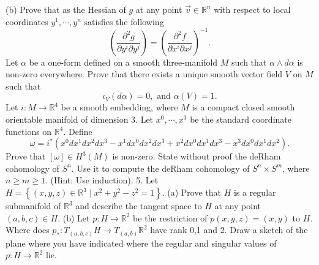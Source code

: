 \documentclass[14pt]{extarticle}
\begin{document}
(b) Prove that as the Hessian of $g$ at any point $\vec{v} \in \mathbb{R}^{n}$ with respect to local coordinates $y^{1}, \cdots, y^{n}$ satisfies the following
$$
\left(\frac{\partial^{2} g}{\partial y^{i} \partial y^{j}}\right)=\left(\frac{\partial^{2} f}{\partial x^{i} \partial x^{j}}\right)^{-1} .
$$
\newpage
Let $\alpha$ be a one-form defined on a smooth three-manifold $M$ such that $\alpha \wedge d \alpha$ is non-zero everywhere.
Prove that there exists a unique smooth vector field $V$ on $M$ such that
$$
\iota_{V}(d \alpha)=0, \text { and } \alpha(V)=1 .
$$
\newpage
Let $i: M \rightarrow \mathbb{R}^{4}$ be a smooth embedding, where $M$ is a compact closed smooth orientable manifold of dimension 3. Let $x^{0}, \cdots, x^{3}$ be the standard coordinate functions on $\mathbb{R}^{4}$. Define
$$
\omega=i^{*}\left(x^{0} d x^{1} d x^{2} d x^{3}-x^{1} d x^{0} d x^{2} d x^{3}+x^{2} d x^{0} d x^{1} d x^{3}-x^{3} d x^{0} d x^{1} d x^{2}\right) .
$$
Prove that $[\omega] \in H^{3}(M)$ is non-zero.
\newpage
State without proof the deRham cohomology of $S^{n}$. Use it to compute the deRham cohomology of $S^{n} \times S^{m}$, where $n \geq m \geq 1$. (Hint: Use induction). 5. Let $H=\left\{(x, y, z) \in \mathbb{R}^{3} \mid x^{2}+y^{2}-z^{2}=1\right\}$.
(a) Prove that $H$ is a regular submanifold of $\mathbb{R}^{3}$ and describe the tangent space to $H$ at any point $(a, b, c) \in H$.
(b) Let $p: H \rightarrow \mathbb{R}^{2}$ be the restriction of $p(x, y, z)=(x, y)$ to $H$. Where does $p_{*}: T_{(a, b, c)} H \rightarrow T_{(a, b)} \mathbb{R}^{2}$ have rank 0,1 and 2. Draw a sketch of the plane where you have indicated where the regular and singular values of $p: H \rightarrow \mathbb{R}^{2}$ lie.
\newpage
\end{document}

